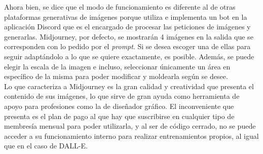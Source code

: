 Ahora bien, se dice que el modo de funcionamiento es diferente al de otras plataformas generativas de imágenes porque utiliza e implementa un bot en la aplicación Discord que es el encargado de procesar las peticiones de imágenes y generarlas. Midjourney, por defecto, se mostrarán 4 imágenes en la salida que se corresponden con lo pedido por el \textit{prompt}. Si se desea escoger una de ellas para seguir adaptándolo a lo que se quiere exactamente, es posible. Además, se puede elegir la escala de la imagen e incluso, seleccionar únicamente un área en específico de la misma para poder modificar y moldearla según se desee. \\

Lo que caracteriza a Midjourney es la gran calidad y creatividad que presenta el contenido de sus imágenes, lo que sirve de gran ayuda como herramienta de apoyo para profesiones como la de diseñador gráfico. El inconveniente que presenta es el plan de pago al que hay que suscribirse en cualquier tipo de membresía mensual para poder utilizarla, y al ser de código cerrado, no se puede acceder a su funcionamiento interno para realizar entrenamientos propios, al igual que en el caso de DALL-E. \\
